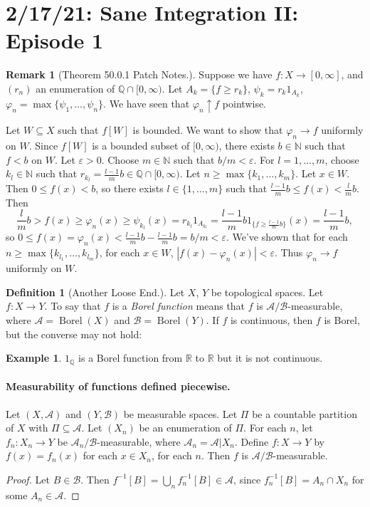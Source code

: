 \documentclass{article}
\DeclareMathOperator{\Borel}{Borel}
\newcommand{\R}{\mathbb{R}}
\newcommand{\Q}{\mathbb{Q}}
\newcommand{\N}{\mathbb{N}}
\newcommand{\oo}{{\infty}}
\theoremstyle{definition}
\newtheorem*{example}{Example}
\newtheorem*{definition}{Definition}
\newtheorem*{remark}{Remark}
\begin{document}
\section*{2/17/21: Sane Integration II: Episode 1}

\begin{remark}[Theorem 50.0.1 Patch Notes.]

Suppose we have $f:X\to[0,\oo]$, and $(r_n)$ an enumeration of $\Q\cap[0,\infty)$. 
Let $A_k = \{f \geq r_k \}$, $\psi_k = r_k1_{A_k}$, $\varphi_n = \max\{\psi_1, \ldots, \psi_n\}$.
We have seen that $\varphi_n \uparrow f$ pointwise.

Let $W \subseteq X$ such that $f[W]$ is bounded. We want to show that $\varphi_n \to f$ uniformly on $W$. Since $f[W]$ is a bounded subset of $[0, \infty)$, there exists $b \in \N$ such that $f < b$ on $W$.
Let $\varepsilon > 0$. Choose $m \in \N$ such that $b/m <\varepsilon$. For $l = 1, \ldots, m$, choose $k_l \in \N$ such that $r_{k_l} = \frac{l-1}{m}b \in \Q \cap [0, \infty)$. Let $n \geq \max\{k_1, \ldots, k_m\}$. Let $x \in W$. Then $0 \leq f(x) < b$, so there exists $l \in \{1, \ldots, m\}$ such that $\frac{l-1}{m}b \leq f(x) < \frac{l}{m}b$.
Then \[\frac{l}{m}b > f(x) \geq \varphi_n(x) \geq \psi_{k_l}(x) = r_{k_l}1_{A_{k_l}} = \frac{l-1}{m}b 1_{\{f \geq \frac{l-1}{m}b\}}(x) = \frac{l-1}{m}b,\]
so $0 \leq f(x) = \varphi_n(x) < \frac{l-1}{m}b - \frac{l-1}{m}b = b/m < \varepsilon$.
We've shown that for each $n \geq \max\{k_{l_1}, \ldots, k_{l_m}\}$, for each $x \in W$, $|f(x) - \varphi_n(x)| < \varepsilon$. Thus $\varphi_n \to f$ uniformly on $W$.
\end{remark}

\begin{definition}[Another Loose End.]
Let $X$, $Y$ be topological spaces. Let $f:X \longrightarrow Y$. To say that $f$ is a \emph{Borel function} means that $f$ is $\mathscr{A}/\mathscr{B}$-measurable, where $\mathscr{A} = \Borel(X)$ and $\mathscr{B} = \Borel(Y)$. If $f$ is continuous, then $f$ is Borel, but the converse may not hold:
\end{definition}
\begin{example}
$1_{\Q}$ is a Borel function from $\R$ to $\R$ but it is not continuous.
\end{example}

\paragraph{Measurability of functions defined piecewise.}
Let $(X, \mathscr{A})$ and $(Y, \mathscr{B})$ be measurable spaces. Let $\Pi$ be a countable partition of $X$ with $\Pi \subseteq \mathscr{A}$. Let $(X_n)$ be an enumeration of $\Pi$. For each $n$, let $f_n: X_n \longrightarrow Y$ be $\mathscr{A}_n/\mathscr{B}$-measurable, where $\mathscr{A}_n = \mathscr{A}|X_n$.
Define $f:X \longrightarrow Y$ by $f(x) = f_n(x)$ for each $x \in X_n$, for each $n$. Then $f$ is $\mathscr{A}/\mathscr{B}$-measurable.
\begin{proof}
    Let $B \in \mathscr{B}$. Then $f^{-1}[B] = \bigcup_n f_n^{-1}[B] \in \mathscr{A}$, since $f_n^{-1}[B] = A_n \cap X_n$ for some $A_n \in \mathscr{A}$.
\end{proof}
\end{document}
